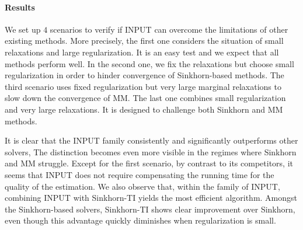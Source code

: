 \paragraph{Results}
We set up $4$ scenarios to verify if INPUT can overcome the limitations of other existing methods.
More precisely, the first one considers the situation of small relaxations and large regularization.
It is an easy test and we expect that all methods perform well.
In the second one, we fix the relaxations but choose small regularization
in order to hinder convergence of Sinkhorn-based methods.
The third scenario uses fixed regularization but very large marginal relaxations to slow down
the convergence of MM.
The last one combines small regularization and very large relaxations. It is designed to challenge
both Sinkhorn and MM methods.

It is clear that the INPUT family consistently and significantly outperforms other solvers,
The distinction becomes even more visible in the regimes where Sinkhorn and MM struggle.
Except for the first scenario, by contrast to its competitors,
it seems that INPUT does not require compensating the running time for the quality of the estimation.
We also observe that, within the family of INPUT,
combining INPUT with Sinkhorn-TI yields the most efficient algorithm.
Amongst the Sinkhorn-based solvers, Sinkhorn-TI shows clear improvement over Sinkhorn,
even though this advantage quickly diminishes when regularization is small.

